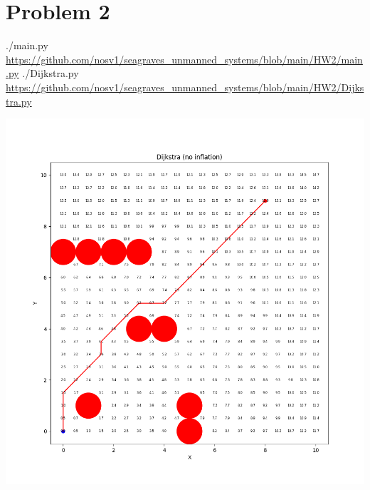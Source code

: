 \documentclass{article}
\begin{document}
        \section*{Problem 2}
            \begin{minipage}{\linewidth}
                \raggedright
                ./main.py \break
                \url{https://github.com/nosv1/seagraves_unmanned_systems/blob/main/HW2/main.py} \break
                ./Dijkstra.py \break
                \url{https://github.com/nosv1/seagraves_unmanned_systems/blob/main/HW2/Dijkstra.py}
                \begin{center}
                    \includegraphics[width=\linewidth]{HW2P2 Dijkstra no inflation.png}
                \end{center}
            \end{minipage}
\end{document}
